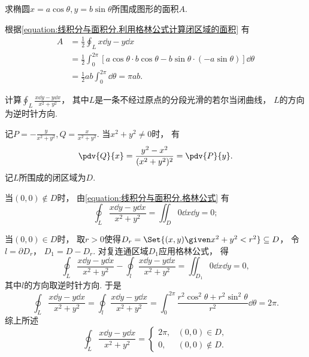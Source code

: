 \begin{example}
求椭圆\(x = a \cos\theta, y = b \sin\theta\)所围成图形的面积\(A\).
\begin{solution}
根据\cref{equation:线积分与面积分.利用格林公式计算闭区域的面积} 有
\begin{align*}
	A &= \frac{1}{2} \oint_L x\dd{y}-y\dd{x} \\
	&= \frac{1}{2} \int_0^{2\pi}
		\left[
			a \cos\theta \cdot b \cos\theta
			- b \sin\theta \cdot (-a \sin\theta)
		\right] \dd{\theta} \\
	&= \frac{1}{2} ab \int_0^{2\pi} \dd{\theta}
	= \pi ab.
\end{align*}
\end{solution}
\end{example}

\begin{example}
计算\(\oint_L \frac{x\dd{y}-y\dd{x}}{x^2+y^2}\)，
其中\(L\)是一条不经过原点的分段光滑的若尔当闭曲线，
\(L\)的方向为逆时针方向.
\begin{solution}
记\(P = -\frac{y}{x^2+y^2}, Q = \frac{x}{x^2+y^2}\).
当\(x^2+y^2\neq0\)时，
有\[
	\pdv{Q}{x} = \frac{y^2-x^2}{(x^2+y^2)^2} = \pdv{P}{y}.
\]
记\(L\)所围成的闭区域为\(D\).

当\((0,0) \notin D\)时，
由\cref{equation:线积分与面积分.格林公式} 有\[
	\oint_L \frac{x\dd{y}-y\dd{x}}{x^2+y^2} = \iint_D 0 \dd{x}\dd{y} = 0;
\]

当\((0,0) \in D\)时，
取\(r>0\)使得\(D_r = \Set{ (x,y) \given x^2+y^2 < r^2 } \subseteq D\)，
令\(l = \partial D_r\)，
\(D_1 = D - D_r\).
对复连通区域\(D_1\)应用格林公式，
得\[
	\oint_L \frac{x\dd{y}-y\dd{x}}{x^2+y^2} - \oint_l \frac{x\dd{y}-y\dd{x}}{x^2+y^2}
	= \iint_{D_1} 0 \dd{x}\dd{y} = 0,
\]
其中\(l\)的方向取逆时针方向.
于是\[
	\oint_L \frac{x\dd{y}-y\dd{x}}{x^2+y^2}
	= \oint_l \frac{x\dd{y}-y\dd{x}}{x^2+y^2}
	= \int_0^{2\pi} \frac{r^2 \cos^2\theta + r^2 \sin^2\theta}{r^2} \dd{\theta}
	= 2\pi.
\]
综上所述\[
	\oint_L \frac{x\dd{y}-y\dd{x}}{x^2+y^2}
	= \begin{cases}
		2\pi, & (0,0) \in D, \\
		0, & (0,0) \notin D.
	\end{cases}
\]
\end{solution}
\end{example}

